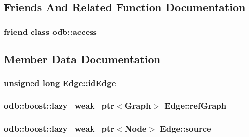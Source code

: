 \subsection{Friends And Related Function Documentation}
\hypertarget{class_edge_acb4d953abf85ae525f1d06a0c3a86a55}{}
\subsubsection[{odb\+::access}]{\setlength{\rightskip}{0pt plus 5cm}friend class odb\+::access\hspace{0.3cm}{\ttfamily [friend]}}\label{class_edge_acb4d953abf85ae525f1d06a0c3a86a55}


\subsection{Member Data Documentation}
\hypertarget{class_edge_a9bf17b3e7e85c981e1eebf7d11d165cf}{}
\subsubsection[{id\+Edge}]{\setlength{\rightskip}{0pt plus 5cm}unsigned long Edge\+::id\+Edge\hspace{0.3cm}{\ttfamily [private]}}\label{class_edge_a9bf17b3e7e85c981e1eebf7d11d165cf}
\hypertarget{class_edge_a3413adc0974742c6e82419c538361fc4}{}
\subsubsection[{ref\+Graph}]{\setlength{\rightskip}{0pt plus 5cm}odb\+::boost\+::lazy\+\_\+weak\+\_\+ptr$<${\bf Graph}$>$ Edge\+::ref\+Graph\hspace{0.3cm}{\ttfamily [private]}}\label{class_edge_a3413adc0974742c6e82419c538361fc4}
\hypertarget{class_edge_a2f063b6ab27e23afd106e5d706023392}{}
\subsubsection[{source}]{\setlength{\rightskip}{0pt plus 5cm}odb\+::boost\+::lazy\+\_\+weak\+\_\+ptr$<${\bf Node}$>$ Edge\+::source\hspace{0.3cm}{\ttfamily [private]}}\label{class_edge_a2f063b6ab27e23afd106e5d706023392}
\hypertarget{class_edge_a93b220a32293b3140f0f51c6cbd5ecc2}{}
